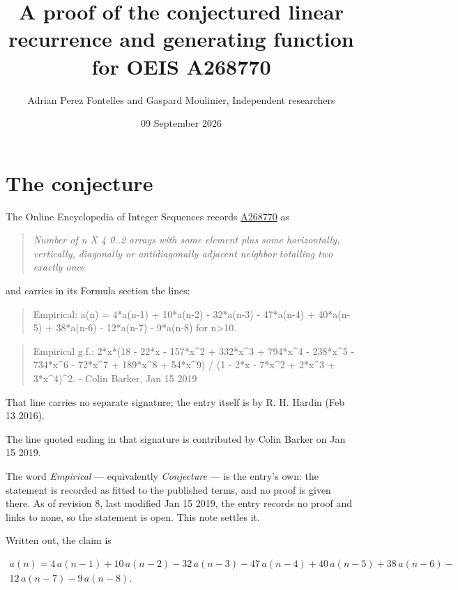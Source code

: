 \documentclass[11pt]{article}
\title{A proof of the conjectured linear recurrence and generating function for OEIS A268770}
\author{Adrian Perez Fontelles and Gaspard Moulinier, Independent researchers}
\date{09 September 2026}
\theoremstyle{definition}
\begin{document}
\maketitle
\section{The conjecture}

The Online Encyclopedia of Integer Sequences records \href{https://oeis.org/A268770}{A268770} as

\begin{quote}\itshape Number of n X 4 0..2 arrays with some element plus some horizontally, vertically, diagonally or antidiagonally adjacent neighbor totalling two exactly once\end{quote}

and carries in its Formula section the lines:

\begin{quote}\ttfamily Empirical: a(n) = 4*a(n-1) + 10*a(n-2) - 32*a(n-3) - 47*a(n-4) + 40*a(n-5) + 38*a(n-6) - 12*a(n-7) - 9*a(n-8) for n>10.\end{quote}

\begin{quote}\ttfamily Empirical g.f.: 2*x*(18 - 22*x - 157*x\textasciicircum{}2 + 332*x\textasciicircum{}3 + 794*x\textasciicircum{}4 - 238*x\textasciicircum{}5 - 734*x\textasciicircum{}6 - 72*x\textasciicircum{}7 + 189*x\textasciicircum{}8 + 54*x\textasciicircum{}9) / (1 - 2*x - 7*x\textasciicircum{}2 + 2*x\textasciicircum{}3 + 3*x\textasciicircum{}4)\textasciicircum{}2. - Colin Barker, Jan 15 2019\end{quote}

That line carries no separate signature; the entry itself is by R. H. Hardin (Feb 13 2016).

The line quoted ending in that signature is contributed by Colin Barker on Jan 15 2019.

The word {\itshape Empirical} --- equivalently {\itshape Conjecture} --- is the entry's own: the statement is recorded as fitted to the published terms, and no proof is given there. As of revision 8, last modified Jan 15 2019, the entry records no proof and links to none, so the statement is open. This note settles it.

Written out, the claim is

\begin{multline*} a(n) = 4\,a(n-1) + 10\,a(n-2) - 32\,a(n-3) - 47\,a(n-4) + 40\,a(n-5) + 38\,a(n-6) - \\ 12\,a(n-7) - 9\,a(n-8). \end{multline*}
\end{document}
